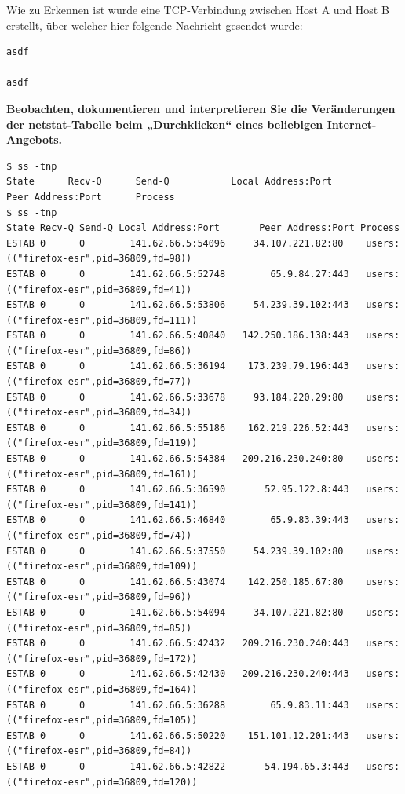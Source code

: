 Wie zu Erkennen ist wurde eine TCP-Verbindung zwischen Host A und Host B
erstellt, über welcher hier folgende Nachricht gesendet wurde:

\begin{verbatim}
asdf

asdf
\end{verbatim}

\textbf{Beobachten, dokumentieren und interpretieren Sie die
Veränderungen der netstat-Tabelle beim „Durchklicken`` eines beliebigen
Internet-Angebots.}

\begin{verbatim}
$ ss -tnp
State      Recv-Q      Send-Q           Local Address:Port           Peer Address:Port      Process
$ ss -tnp
State Recv-Q Send-Q Local Address:Port       Peer Address:Port Process
ESTAB 0      0        141.62.66.5:54096     34.107.221.82:80    users:(("firefox-esr",pid=36809,fd=98))
ESTAB 0      0        141.62.66.5:52748        65.9.84.27:443   users:(("firefox-esr",pid=36809,fd=41))
ESTAB 0      0        141.62.66.5:53806     54.239.39.102:443   users:(("firefox-esr",pid=36809,fd=111))
ESTAB 0      0        141.62.66.5:40840   142.250.186.138:443   users:(("firefox-esr",pid=36809,fd=86))
ESTAB 0      0        141.62.66.5:36194    173.239.79.196:443   users:(("firefox-esr",pid=36809,fd=77))
ESTAB 0      0        141.62.66.5:33678     93.184.220.29:80    users:(("firefox-esr",pid=36809,fd=34))
ESTAB 0      0        141.62.66.5:55186    162.219.226.52:443   users:(("firefox-esr",pid=36809,fd=119))
ESTAB 0      0        141.62.66.5:54384   209.216.230.240:80    users:(("firefox-esr",pid=36809,fd=161))
ESTAB 0      0        141.62.66.5:36590       52.95.122.8:443   users:(("firefox-esr",pid=36809,fd=141))
ESTAB 0      0        141.62.66.5:46840        65.9.83.39:443   users:(("firefox-esr",pid=36809,fd=74))
ESTAB 0      0        141.62.66.5:37550     54.239.39.102:80    users:(("firefox-esr",pid=36809,fd=109))
ESTAB 0      0        141.62.66.5:43074    142.250.185.67:80    users:(("firefox-esr",pid=36809,fd=96))
ESTAB 0      0        141.62.66.5:54094     34.107.221.82:80    users:(("firefox-esr",pid=36809,fd=85))
ESTAB 0      0        141.62.66.5:42432   209.216.230.240:443   users:(("firefox-esr",pid=36809,fd=172))
ESTAB 0      0        141.62.66.5:42430   209.216.230.240:443   users:(("firefox-esr",pid=36809,fd=164))
ESTAB 0      0        141.62.66.5:36288        65.9.83.11:443   users:(("firefox-esr",pid=36809,fd=105))
ESTAB 0      0        141.62.66.5:50220    151.101.12.201:443   users:(("firefox-esr",pid=36809,fd=84))
ESTAB 0      0        141.62.66.5:42822       54.194.65.3:443   users:(("firefox-esr",pid=36809,fd=120))

\end{verbatim}
